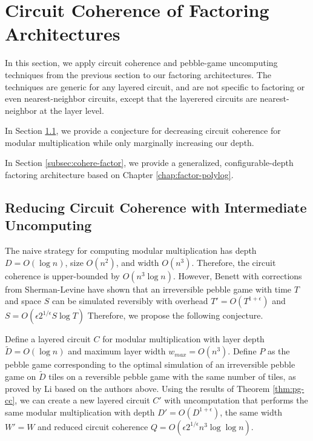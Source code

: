 \section{Circuit Coherence of Factoring Architectures}
\label{sec:cohere-factor}

In this section, we apply circuit coherence and pebble-game
uncomputing techniques from the previous section to our
factoring architectures. The techniques are generic for
any layered circuit, and are not specific to factoring or
even nearest-neighbor circuits, except that the layerered circuits
are nearest-neighbor at the layer level.

In Section \ref{subsec:cohere-conject}, we provide a conjecture
for decreasing circuit coherence for modular multiplication while
only marginally increasing our depth.

In Section \ref{subsec:cohere-factor}, we provide a generalized,
configurable-depth factoring architecture based on
Chapter \ref{chap:factor-polylog}.

\subsection{Reducing Circuit Coherence with Intermediate Uncomputing}
\label{subsec:cohere-conject}

The naive strategy for computing modular multiplication has
depth $D = O(\log n)$, size $O(n^2)$, and width $O(n^3)$. Therefore, the
circuit coherence is upper-bounded by $O(n^3 \log n)$. However,
Benett \cite{Bennett1989} with corrections from
Sherman-Levine \cite{Levine1990} have shown that an irreversible
pebble game with time $T$ and space $S$ can be simulated reversibly
with overhead $T' = O(T^{1+\epsilon})$ and $S = O(\epsilon 2^{1/\epsilon} S \log T)$
Therefore, we propose the following conjecture.

\begin{conjecture}
Define a layered circuit $C$ for modular multiplication
with layer depth $\tilde{D} = O(\log n)$ and maximum layer width
$w_{max} = O(n^3)$.
Define $P$ as the pebble game corresponding to the optimal simulation of
an irreversible pebble game on $\tilde{D}$ tiles on a reversible
pebble game with the same number of tiles, as proved by
Li \cite{Li1998} based on the authors above.
Using the results of Theorem \ref{thm:pg-cc}, we can create a new
layered circuit $C'$ with uncomputation that performs the
same modular multiplication with depth $D' = O(D^{1+\epsilon})$,
the same width $W' = W$
and reduced circuit coherence $Q = O(\epsilon 2^{1/\epsilon} n^3 \log\log n)$.
\end{conjecture}

